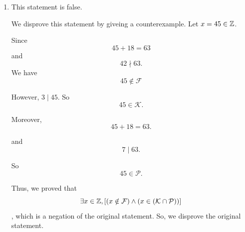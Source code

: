 \begin{enumerate}[label = (\alph*)]
\begin{solution}
        By the definition of divisibility, we have 
        \begin{equation*}
            7 \mid x + 18. 
        \end{equation*}

        We obtain $x \in \mathcal{P}$. 

        Therefore, we proved 
        \begin{equation*}
            \forall x \in \Z, \bracks{\paren{x \in \mathcal{F}} \implies \paren{x \in \paren{\mathcal{K} \cap \mathcal{P}}}}
        \end{equation*}
    \end{solution}

    \newpage
    \item \begin{solution}
        This statement is false. 

        We disprove this statement by giveing a counterexample. Let $x = 45 \in \mathbb{Z}$. 
        
        Since 
        \begin{equation*}
            45 + 18 = 63
        \end{equation*}
        and 
        \begin{equation*}
            42 \nmid 63. 
        \end{equation*}
        We have 
        \begin{equation*}
            45 \notin \mathcal{F}
        \end{equation*}

        However, $3 \mid 45$. 
        So 
        \begin{equation*}
            45 \in \mathcal{K}. 
        \end{equation*}

        Moreover, 
        \begin{equation*}
            45 + 18 = 63. 
        \end{equation*}

        and 
        \begin{equation*}
            7 \mid 63. 
        \end{equation*}

        So 
        \begin{equation*}
            45 \in \mathcal{P}. 
        \end{equation*}

        Thus, we proved that 
        \begin{equation*}
            \exists x \in \mathbb{Z}, \left[\left(x \notin \mathcal{F}\right) \wedge \left(x \in \left(\mathcal{K} \cap \mathcal{P}\right)\right)\right]
        \end{equation*}
        , which is a negation of the original statement. 
        So, we disprove the original statement. 
    \end{solution}
\end{enumerate}